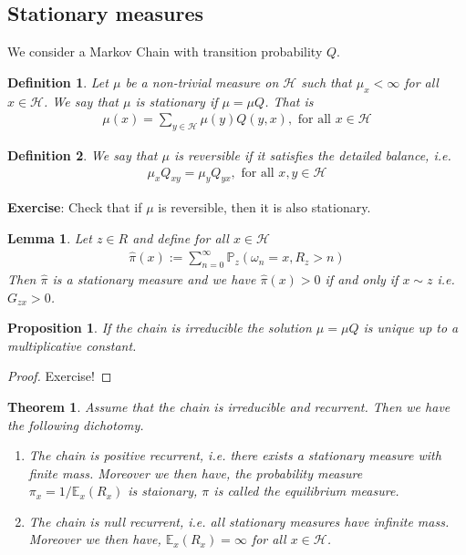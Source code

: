 \documentclass[11pt,a4paper, final]{article}
\newtheorem{lem}{Lemma}[section]
\newtheorem{thm}{Theorem}[section]
\newtheorem{prop}{Proposition}[section]
\newtheorem{defn}{Definition}[section]
\theoremstyle{definition}
\begin{document}
\subsection{Stationary measures}
We consider a Markov Chain with transition probability $Q$. 
\begin{defn} Let $\mu$ be a non-trivial measure on $\mathcal{H}$ such that $\mu_x< \infty$ for all $x \in \mathcal{H}$. We say that $\mu$ is stationary if $\mu = \mu Q$.  That is
\begin{align*}
\mu (x) =  \sum_{y \in \mathcal{H}} \mu(y) Q(y,x), \text{ for all } x \in \mathcal{H}
\end{align*}
\end{defn}
\begin{defn} We say that $\mu$ is reversible if it satisfies the detailed balance, i.e. 
\begin{align*}
\mu_x Q_{xy} = \mu_y Q_{yx}, \text{ for all } x,y \in  \mathcal{H}
\end{align*}
\end{defn}
\textbf{Exercise}: Check that if $\mu$ is reversible, then it is also stationary. 
\begin{lem} Let $z \in R$ and define for all $x \in \mathcal{H}$
\begin{align*}
\hat{\pi}(x):= \sum_{n=0}^\infty \mathbb{P}_z ( \omega_n =x, R_z >n )
\end{align*}
Then $\hat{\pi}$ is a stationary measure and we have $\hat{\pi}(x) >0 $ if and only if $x \sim z$ i.e. $G_{zx}>0$. 
\end{lem}
\begin{prop} If the chain is irreducible the solution $\mu = \mu Q$ is unique up to a multiplicative constant. 
\end{prop}
\begin{proof}
Exercise! 
\end{proof}
\begin{thm} Assume that the chain is irreducible and recurrent. Then we have the following dichotomy. 
\begin{enumerate}
\item The chain is positive recurrent, i.e. there exists a stationary measure with finite mass. Moreover we then have, the probability measure \\ $ \pi_x = 1/ \mathbb{E}_x(R_x)$ is staionary, $\pi$ is called the equilibrium measure. 
\item The chain is null recurrent, i.e. all stationary measures have infinite mass. Moreover we then have, $\mathbb{E}_x(R_x) =  \infty$ for all $x \in \mathcal{H}$. 
\end{enumerate}
\end{thm}
\end{document}

